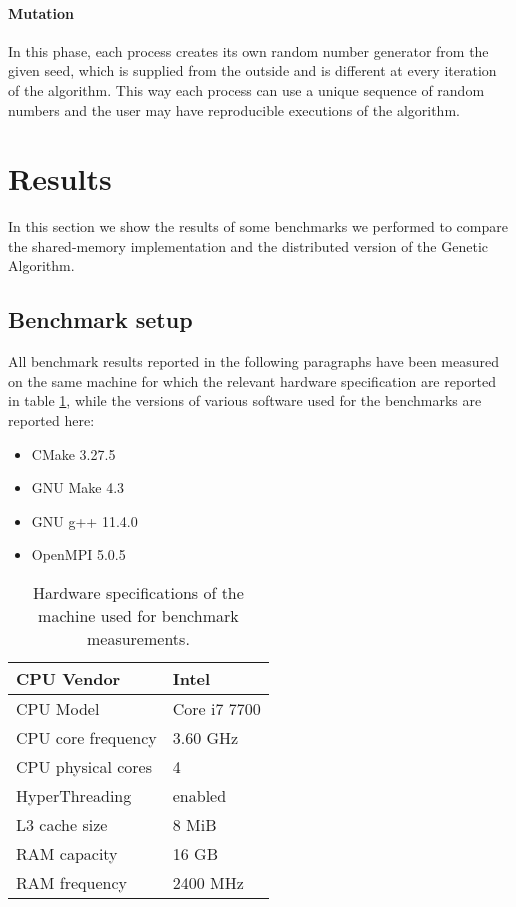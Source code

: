 \documentclass[12pt,a4paper,oneside]{article}
\begin{document}
	\paragraph{Mutation}
	In this phase, each process creates its own random number generator from the given seed, which is supplied from the outside and is different at every iteration of the algorithm.
	This way each process can use a unique sequence of random numbers and the user may have reproducible executions of the algorithm.
	
	\clearpage
	\section{Results}
	In this section we show the results of some benchmarks we performed to compare the shared-memory implementation and the distributed version of the Genetic Algorithm.

	\subsection{Benchmark setup}
	All benchmark results reported in the following paragraphs have been measured on the same machine for which the relevant hardware specification are reported in table \ref{hw-specs}, while the versions of various software used for the benchmarks are reported here:
	
	\begin{itemize}
		\item CMake 3.27.5
		\item GNU Make 4.3
		\item GNU g++ 11.4.0
		\item OpenMPI 5.0.5
	\end{itemize}

	\begin{table}[!ht]
		\centering
		\begin{tabular}{|l|l|}
			\hline
			CPU Vendor         & Intel        \\ \hline
			CPU Model          & Core i7 7700 \\ \hline
			CPU core frequency & 3.60 GHz     \\ \hline
			CPU physical cores & 4            \\ \hline
			HyperThreading     & enabled      \\ \hline
			L3 cache size      & 8 MiB        \\ \hline
			RAM capacity       & 16 GB        \\ \hline
			RAM frequency      & 2400 MHz     \\ \hline
		\end{tabular}
		\caption{Hardware specifications of the machine used for benchmark measurements.}
		\label{hw-specs}
	\end{table}
\end{document}
